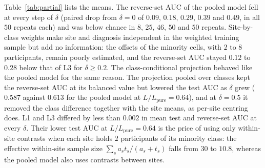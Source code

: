 Table~\ref{tab:partial} lists the means. The reverse-set AUC of the pooled model fell at every step of $\delta$ (paired drop from $\delta=0$ of $0.09$, $0.18$, $0.29$, $0.39$ and $0.49$, in all $50$ repeats each) and was below chance in $8$, $25$, $46$, $50$ and $50$ repeats. Site-by-class weights make site and diagnosis independent in the weighted training sample but add no information: the offsets of the minority cells, with $2$ to $8$ participants, remain poorly estimated, and the reverse-set AUC stayed $0.12$ to $0.28$ below that of L3 for $\delta\ge0.2$. The class-conditional projection behaved like the pooled model for the same reason. The projection pooled over classes kept the reverse-set AUC at its balanced value but lowered the test AUC as $\delta$ grew ($0.587$ against $0.613$ for the pooled model at $L/L_{\mathrm{pure}}=0.64$), and at $\delta=0.5$ it removed the class difference together with the site means, as per-site centring does. L1 and L3 differed by less than $0.002$ in mean test and reverse-set AUC at every $\delta$. Their lower test AUC at $L/L_{\mathrm{pure}}=0.64$ is the price of using only within-site contrasts when each site holds $2$ participants of its minority class: the effective within-site sample size $\sum_s a_st_s/(a_s+t_s)$ falls from $30$ to $10.8$, whereas the pooled model also uses contrasts between sites.

